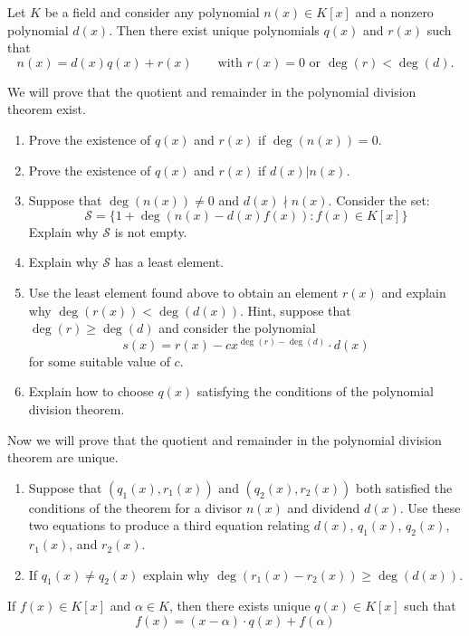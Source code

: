 \documentclass{ximera}
\begin{document}
\begin{theorem}\label{T:divThmPoly}

Let $K$ be a field and consider any polynomial $n(x)\in K[x]$ and a
nonzero polynomial $d(x)$. Then there exist unique polynomials $q(x)$
and $r(x)$ such that
\[
n(x) = d(x) q(x) + r(x) \qquad \text{with $r(x) = 0$ or $\deg(r) <
  \deg(d)$}.
\]
\begin{sketch}
  We will prove that the quotient and remainder in the polynomial
  division theorem exist.
\begin{enumerate}
\item Prove the existence of $q(x)$ and $r(x)$ if $\deg(n(x))=0$.
\item Prove the existence of $q(x)$ and $r(x)$ if $d(x)|n(x)$.
\item Suppose that $\deg(n(x)) \ne 0$ and $d(x)\nmid n(x)$. Consider the set:
\[
\mathcal{S} = \{1+\deg(n(x) -  d(x)f(x)) : f(x)\in K[x]\}
\]
Explain why $\mathcal S$ is not empty.
\item Explain why $\mathcal S$ has a least element.
\item Use the least element found above to obtain an element $r(x)$
  and explain why $\deg(r(x)) < \deg(d(x))$. Hint, suppose that $\deg(r)\ge
  \deg(d)$ and consider the polynomial
  \[
  s(x) = r(x) - cx^{\deg(r)-\deg(d)} \cdot d(x)
  \]
  for some suitable value of $c$.
\item Explain how to choose $q(x)$ satisfying the conditions of the
  polynomial division theorem.
\end{enumerate}

Now we will prove that the quotient and remainder in the polynomial
division theorem are unique.
\begin{enumerate}
\item Suppose that $(q_1(x),r_1(x))$ and $(q_2(x),r_2(x))$ both satisfied the
  conditions of the theorem for a divisor $n(x)$ and dividend
  $d(x)$. Use these two equations to produce a third equation relating
  $d(x)$, $q_1(x)$, $q_2(x)$, $r_1(x)$, and $r_2(x)$.
\item If $q_1(x) \ne q_2(x)$ explain why $\deg(r_1(x) - r_2(x)) \ge \deg(d(x))$.
\end{enumerate}
\end{sketch}
\end{theorem}

\begin{corollary}\label{C:rlf}
  If $f(x)\in K[x]$ and $\alpha\in K$, then there exists unique $q(x)\in
  K[x]$ such that
  \[
  f(x) = (x-\alpha)\cdot q(x) + f(\alpha)
  \]
\end{corollary}
\end{document}
